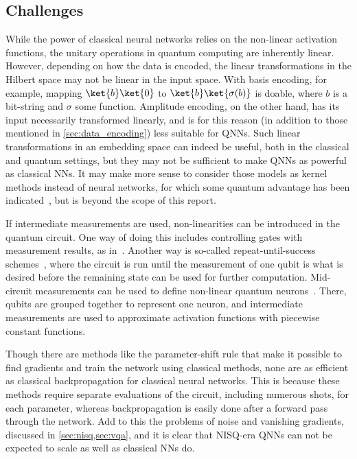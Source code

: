 \subsection{Challenges}
While the power of classical neural networks relies on the non-linear activation functions, the unitary operations in quantum computing are inherently linear.
However, depending on how the data is encoded, the linear transformations in the Hilbert space may not be linear in the input space.
With basis encoding, for example, mapping $\ket{b}\ket{0}$ to $\ket{b}\ket{\sigma(b)}$ is doable, where $b$ is a bit-string and $\sigma$ some function.
Amplitude encoding, on the other hand, has its input necessarily transformed linearly, and is for this reason (in addition to those mentioned in \cref{sec:data_encoding}) less suitable for QNNs.
Such linear transformations in an embedding space can indeed be useful, both in the classical and quantum settings, but they may not be sufficient to make QNNs as powerful as classical NNs.
It may make more sense to consider those models as kernel methods instead of neural networks, for which some quantum advantage has been indicated~\autocite{schuld2019a}, but is beyond the scope of this report.

If intermediate measurements are used, non-linearities can be introduced in the quantum circuit.
One way of doing this includes controlling gates with measurement results, as in~\autocite{cong2019}.
Another way is so-called repeat-until-success schemes~\autocite{cao2017}, where the circuit is run until the measurement of one qubit is what is desired before the remaining state can be used for further computation.
Mid-circuit measurements can be used to define non-linear quantum neurons~\autocite{yan2020}.
There, qubits are grouped together to represent one neuron, and intermediate measurements are used to approximate activation functions with piecewise constant functions.

Though there are methods like the parameter-shift rule that make it possible to find gradients and train the network using classical methods, none are as efficient as classical backpropagation for classical neural networks.
This is because these methods require separate evaluations of the circuit, including numerous shots, for each parameter, whereas backpropagation is easily done after a forward pass through the network.
Add to this the problems of noise and vanishing gradients, discussed in \cref{sec:nisq,sec:vqa}, and it is clear that NISQ-era QNNs can not be expected to scale as well as classical NNs do.


